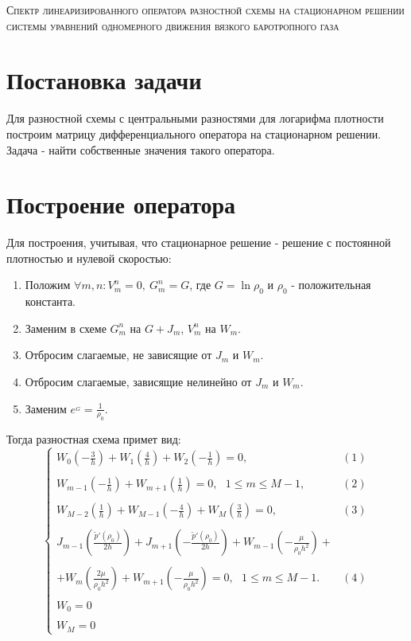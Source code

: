 \documentclass[a4paper, 11pt]{article}
\begin{document}
\begin{center}

\textsc{Спектр линеаризированного оператора разностной схемы на стационарном решении
системы уравнений одномерного движения вязкого баротропного газа}

\end{center}

\section{Постановка задачи}
Для разностной схемы с центральными разностями для логарифма плотности построим матрицу
дифференциального оператора на стационарном решении.
Задача - найти собственные значения такого оператора.

\section{Построение оператора}
Для построения, учитывая, что стационарное решение - решение с постоянной плотностью и нулевой скоростью:
\begin{enumerate}
\item Положим $\forall m, n : V_m^n = 0,\ G_m^n = G$, где $G = \ln \rho_0$ и $\rho_0$ - положительная константа.
\item Заменим в схеме $G_m^n$ на $G + J_m$,  $V_m^n$ на $W_m$.
\item Отбросим слагаемые, не зависящие от $J_m$ и $W_m$.
\item Отбросим слагаемые, зависящие нелинейно от $J_m$ и $W_m$.
\item Заменим $e^{_G} = \frac{1}{\rho_0}$.
\end{enumerate}

\newpage

Тогда разностная схема примет вид:
$$
\begin{cases}
\displaystyle{
W_0 \left(-\frac{3}{h}\right) + W_1 \left(\frac{4}{h}\right) + W_2 \left(-\frac{1}{h}\right) = 0,
} & (1)
\\
\\
\displaystyle{
W_{m - 1} \left(-\frac{1}{h}\right) + W_{m + 1} \left(\frac{1}{h}\right) = 0,\ \ \ 1 \leqslant m \leqslant M - 1,
}  & (2)
\\
\\
\displaystyle{
W_{M - 2} \left(\frac{1}{h}\right) + W_{M - 1} \left(-\frac{4}{h}\right) + W_M \left(\frac{3}{h}\right) = 0, 
} & (3)
\\
\\
\displaystyle{
J_{m-1} \left(\frac{\tilde{p}' (\rho_0)}{2h}\right) + J_{m + 1} \left(-\frac{\tilde{p}' (\rho_0)}{2h}\right) + 
W_{m-1} \left(-\frac{\mu}{\rho_0 h^2}\right) + 
} 
\\
\\
\displaystyle{
+ W_m \left(\frac{2\mu}{\rho_0 h^2}\right) +
W_{m+1} \left(-\frac{\mu}{\rho_0 h^2}\right) = 0,\ \ \ 1\leqslant m \leqslant M - 1.
} & (4)
\\
\\
W_0 = 0
\\
\\
W_M = 0
\end{cases}
$$
\end{document}
